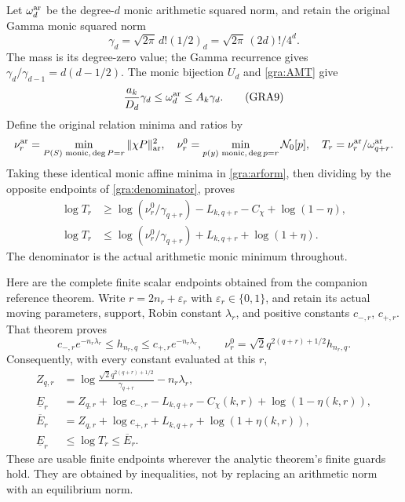 \documentclass[11pt,a4paper]{article}
\begin{document}
Let $\omega_d^{\rm ar}$ be the degree-$d$ monic arithmetic squared norm,
and retain the original Gamma monic squared norm
\[
 \gamma_d=\sqrt{2\pi}\,d!(1/2)_d
          =\sqrt{2\pi}\,(2d)!/4^d.
\]
The mass is its degree-zero value; the Gamma recurrence gives
$\gamma_d/\gamma_{d-1}=d(d-1/2)$.  The monic bijection $U_d$ and
\eqref{gra:AMT} give
\begin{equation}
 \frac{a_k}{D_d}\gamma_d\le\omega_d^{\rm ar}\le A_k\gamma_d.
 \tag{GRA9}\label{gra:denominator}
\end{equation}
Define the original relation minima and ratios by
\[
 \nu_r^{\rm ar}=\min_{P(S)\text{ monic},\,\deg P=r}
                 \|\chi P\|_{\rm ar}^2,\quad
 \nu_r^0=\min_{p(y)\text{ monic},\,\deg p=r}\mathcal N_0[p],\quad
 T_r=\nu_r^{\rm ar}/\omega_{q+r}^{\rm ar}.
\]
Taking these identical monic affine minima in \eqref{gra:arform}, then
dividing by the opposite endpoints of \eqref{gra:denominator}, proves
\begin{equation}
 \begin{aligned}
 \log T_r&\ge\log(\nu_r^0/\gamma_{q+r})-L_{k,q+r}
                 -C_\chi+\log(1-\eta),\\
 \log T_r&\le\log(\nu_r^0/\gamma_{q+r})+L_{k,q+r}
                 +\log(1+\eta).
 \end{aligned}\tag{GRA10}\label{gra:monictransfer}
\end{equation}
The denominator is the actual arithmetic monic minimum throughout.

Here are the complete finite scalar endpoints obtained from the companion
reference theorem.  Write $r=2n_r+\varepsilon_r$ with
$\varepsilon_r\in\{0,1\}$, and retain its actual moving parameters,
support, Robin constant $\lambda_r$, and positive constants $c_{-,r}$,
$c_{+,r}$.  That theorem proves
\[
 c_{-,r}e^{-n_r\lambda_r}
 \le h_{n_r,q}\le c_{+,r}e^{-n_r\lambda_r},\qquad
 \nu_r^0=\sqrt2q^{2(q+r)+1/2}h_{n_r,q}.
\]
Consequently, with every constant evaluated at this $r$,
\begin{equation}
 \begin{aligned}
 Z_{q,r}&=\log\frac{\sqrt2q^{2(q+r)+1/2}}{\gamma_{q+r}}
                  -n_r\lambda_r,\\
 \underline E_r&=Z_{q,r}+\log c_{-,r}-L_{k,q+r}
                  -C_\chi(k,r)+\log(1-\eta(k,r)),\\
 \overline E_r&=Z_{q,r}+\log c_{+,r}+L_{k,q+r}
                  +\log(1+\eta(k,r)),\\
 \underline E_r&\le\log T_r\le\overline E_r.
 \end{aligned}\tag{GRA11}\label{gra:finiteE}
\end{equation}
These are usable finite endpoints wherever the analytic theorem's finite
guards hold.  They are obtained by inequalities, not by replacing an
arithmetic norm with an equilibrium norm.
\end{document}
